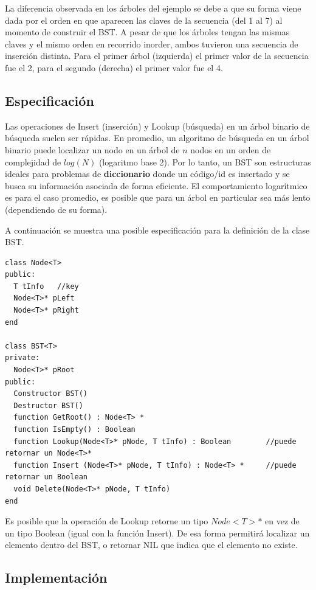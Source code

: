 La diferencia observada en los árboles del ejemplo se debe a que su forma viene dada por el orden en que aparecen las claves de la secuencia (del 1 al 7) al momento de construir el BST. A pesar de que los árboles tengan las mismas claves y el mismo orden en recorrido inorder, ambos tuvieron una secuencia de inserción distinta. Para el primer árbol (izquierda) el primer valor de la secuencia fue el 2, para el segundo (derecha) el primer valor fue el 4.


\subsection{Especificación}

Las operaciones de Insert (inserción) y Lookup (búsqueda) en un árbol binario de búsqueda suelen ser rápidas. En promedio, un algoritmo de búsqueda en un árbol binario puede localizar un nodo en un árbol de $n$ nodos en un orden de complejidad de $log(N)$ (logaritmo base 2). Por lo tanto, un BST son estructuras ideales para problemas de \textbf{diccionario} donde un código/id es insertado y se busca su información asociada de forma eficiente. El comportamiento logarítmico es para el caso promedio, es posible que para un árbol en particular sea más lento (dependiendo de su forma).

A continuación se muestra una posible especificación para la definición de la clase BST.

\begin{lstlisting}[upquote=true, language=pseudo]
class Node<T>
public:
  T tInfo	//key
  Node<T>* pLeft
  Node<T>* pRight
end

class BST<T>
private:
  Node<T>* pRoot
public:
  Constructor BST()
  Destructor BST()
  function GetRoot() : Node<T> *
  function IsEmpty() : Boolean
  function Lookup(Node<T>* pNode, T tInfo) : Boolean  		//puede retornar un Node<T>*
  function Insert (Node<T>* pNode, T tInfo) : Node<T> * 	//puede retornar un Boolean
  void Delete(Node<T>* pNode, T tInfo)
end
\end{lstlisting}

Es posible que la operación de Lookup retorne un tipo $Node<T>*$ en vez de un tipo Boolean (igual con la función Insert). De esa forma permitirá localizar un elemento dentro del BST, o retornar NIL que indica que el elemento no existe.

\subsection{Implementación}

